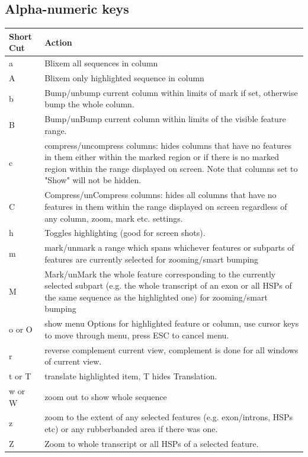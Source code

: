 \documentclass[letterpaper]{article}
\begin{document}
\subsection{Alpha-numeric keys}
\begin{supertabular}{|m{1.5cm}|m{13cm}|}
\hline
Short Cut & Action\\\hline
a & Blixem all sequences in column\\
A & Blixem only highlighted sequence in column\\
b & Bump/unbump current column within limits of mark if set, otherwise bump the whole column.\\
B & Bump/unBump current column within limits of the visible feature range.\\
c & compress/uncompress columns: hides columns that have no features in them either within the marked region or if there is no marked region within the range displayed on screen. Note that columns set to "Show" will not be hidden.\\
C & Compress/unCompress columns: hides all columns that have no features in them within the range displayed on screen regardless of any column, zoom, mark etc. settings.\\
h & Toggles highlighting (good for screen shots).\\
m & mark/unmark a range which spans whichever features or subparts of features are currently selected for zooming/smart bumping\\
M & Mark/unMark the whole feature corresponding to the currently selected subpart (e.g. the whole transcript of an exon or all HSPs of the same sequence as the highlighted one) for zooming/smart bumping\\
o or O & show menu Options for highlighted feature or column, use cursor keys to move through menu, press ESC to cancel menu.\\
r & reverse complement current view, complement is done for all windows of current view.\\
t or T & translate highlighted item, T hides Translation.\\
w or W & zoom out to show whole sequence\\
z & zoom to the extent of any selected features (e.g. exon/introns, HSPs etc) or any rubberbanded area if there was one.\\
Z & Zoom to whole transcript or all HSPs of a selected feature.\\
\hline
\end{supertabular}
\end{document}
